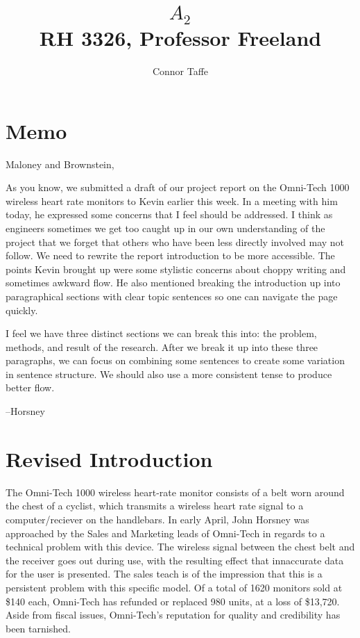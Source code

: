 \documentclass[11pt]{article}
\title{
	$A_{2}$ \\
	\large{RH 3326, Professor Freeland}
}
\author{Connor Taffe}
\begin{document}
\maketitle

\section{Memo}

Maloney and Brownstein,

As you know, we submitted a draft of our project report on the Omni-Tech 1000
wireless heart rate monitors to Kevin earlier this week. In a meeting with him
today, he expressed some concerns that I feel should be addressed. I think as
engineers sometimes we get too caught up in our own understanding of the project
that we forget that others who have been less directly involved may not follow.
We need to rewrite the report introduction to be more accessible. The points Kevin
brought up were some stylistic concerns about choppy writing and sometimes
awkward flow. He also mentioned breaking the introduction up into paragraphical
sections with clear topic sentences so one can navigate the page quickly.

I feel we have three distinct sections we can break this into: the problem, methods,
and result of the research. After we break it up into these three paragraphs,
we can focus on combining some sentences to create some variation in sentence
structure. We should also use a more consistent tense to produce better flow.

--Horsney

\section{Revised Introduction}

The Omni-Tech 1000 wireless heart-rate monitor consists of a belt worn around
the chest of a cyclist, which transmits a wireless heart rate signal to a
computer/reciever on the handlebars. In early April, John Horsney was approached
by the Sales and Marketing leads of Omni-Tech in regards to a technical problem
with this device. The wireless signal between the chest belt and the receiver
goes out during use, with the resulting effect that innaccurate data for the user
is presented. The sales teach is of the impression that this is a persistent problem
with this specific model. Of a total of 1620 monitors sold at \$140 each, Omni-Tech
has refunded or replaced 980 units, at a loss of \$13,720. Aside from fiscal issues,
Omni-Tech's reputation for quality and credibility has been tarnished.
\end{document}
